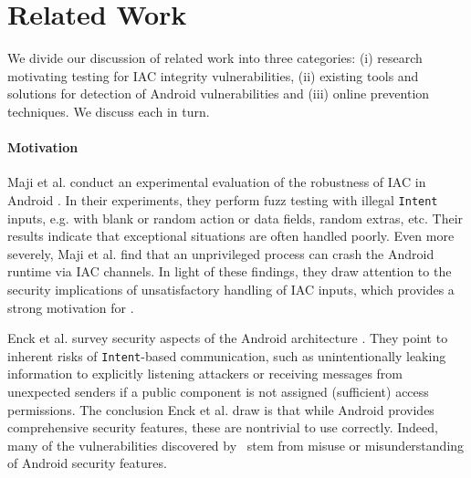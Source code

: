 \section{Related Work}\label{Se:related}

We divide our discussion of related work into three categories: (i) research motivating testing for IAC integrity vulnerabilities, (ii) existing tools and solutions for detection of Android vulnerabilities and (iii) online prevention techniques. We discuss each in turn.


\paragraph{Motivation} Maji et al. conduct an experimental evaluation of the robustness of IAC in Android \cite{MAB:DSN12}. In their experiments, they perform fuzz testing with illegal {\tt Intent} inputs, e.g. with blank or random action or data fields, random extras, etc. Their results indicate that exceptional situations are often handled poorly. Even more severely, Maji et al. find that an unprivileged process can crash the Android runtime via IAC channels. 
%
In light of these findings, they draw attention to the security implications of unsatisfactory handling of IAC inputs, which provides a strong motivation for \Tool. 

%
%

Enck et al. survey security aspects of the Android architecture \cite{EOM:SP09}. They point to inherent risks of {\tt Intent}-based communication, such as unintentionally leaking information to explicitly listening attackers or receiving messages from unexpected senders if a public component is not assigned (sufficient) access permissions. The conclusion Enck et al. draw is that while Android provides comprehensive security features, these are nontrivial to use correctly. Indeed, many of the vulnerabilities discovered by \Tool\ stem from misuse or misunderstanding of Android security features. 


